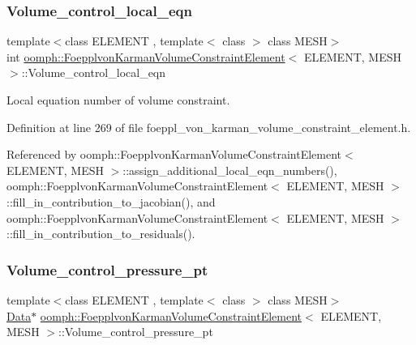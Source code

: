 \subsubsection{\texorpdfstring{Volume\+\_\+control\+\_\+local\+\_\+eqn}{Volume\_control\_local\_eqn}}
{\footnotesize\ttfamily template$<$class E\+L\+E\+M\+E\+NT , template$<$ class $>$ class M\+E\+SH$>$ \\
int \hyperlink{classoomph_1_1FoepplvonKarmanVolumeConstraintElement}{oomph\+::\+Foepplvon\+Karman\+Volume\+Constraint\+Element}$<$ E\+L\+E\+M\+E\+NT, M\+E\+SH $>$\+::Volume\+\_\+control\+\_\+local\+\_\+eqn\hspace{0.3cm}{\ttfamily [protected]}}



Local equation number of volume constraint. 



Definition at line 269 of file foeppl\+\_\+von\+\_\+karman\+\_\+volume\+\_\+constraint\+\_\+element.\+h.



Referenced by oomph\+::\+Foepplvon\+Karman\+Volume\+Constraint\+Element$<$ E\+L\+E\+M\+E\+N\+T, M\+E\+S\+H $>$\+::assign\+\_\+additional\+\_\+local\+\_\+eqn\+\_\+numbers(), oomph\+::\+Foepplvon\+Karman\+Volume\+Constraint\+Element$<$ E\+L\+E\+M\+E\+N\+T, M\+E\+S\+H $>$\+::fill\+\_\+in\+\_\+contribution\+\_\+to\+\_\+jacobian(), and oomph\+::\+Foepplvon\+Karman\+Volume\+Constraint\+Element$<$ E\+L\+E\+M\+E\+N\+T, M\+E\+S\+H $>$\+::fill\+\_\+in\+\_\+contribution\+\_\+to\+\_\+residuals().

\mbox{\label{classoomph_1_1FoepplvonKarmanVolumeConstraintElement_a15515003602f6303d5798b3553331fac}} 
\subsubsection{\texorpdfstring{Volume\+\_\+control\+\_\+pressure\+\_\+pt}{Volume\_control\_pressure\_pt}}
{\footnotesize\ttfamily template$<$class E\+L\+E\+M\+E\+NT , template$<$ class $>$ class M\+E\+SH$>$ \\
\hyperlink{classoomph_1_1Data}{Data}$\ast$ \hyperlink{classoomph_1_1FoepplvonKarmanVolumeConstraintElement}{oomph\+::\+Foepplvon\+Karman\+Volume\+Constraint\+Element}$<$ E\+L\+E\+M\+E\+NT, M\+E\+SH $>$\+::Volume\+\_\+control\+\_\+pressure\+\_\+pt\hspace{0.3cm}{\ttfamily [protected]}}



